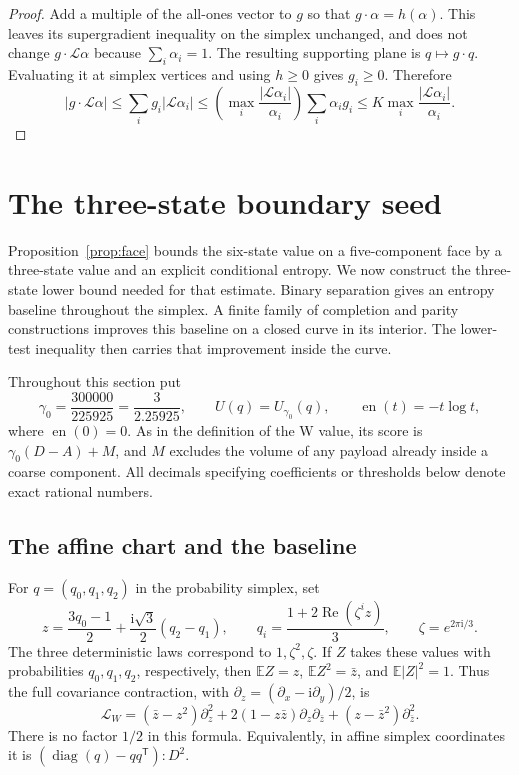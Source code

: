 \documentclass[11pt]{article}
\numberwithin{equation}{section}
\theoremstyle{definition}
\theoremstyle{remark}
\newcommand{\E}{\mathbb E}
\DeclareMathOperator{\diag}{diag}
\DeclareMathOperator{\en}{en}
\begin{document}
\begin{proof}
Add a multiple of the all-ones vector to \(g\) so that
\(g\cdot\alpha=h(\alpha)\).  This leaves its supergradient inequality
on the simplex unchanged, and does not change \(g\cdot\mathcal L\alpha\)
because \(\sum_i\alpha_i=1\).  The resulting supporting plane is
\(q\mapsto g\cdot q\).  Evaluating it at simplex vertices and using
\(h\geq0\) gives \(g_i\geq0\).  Therefore
\[
 |g\cdot\mathcal L\alpha|
 \leq\sum_i g_i|\mathcal L\alpha_i|
 \leq\left(\max_i\frac{|\mathcal L\alpha_i|}{\alpha_i}\right)
       \sum_i\alpha_i g_i
 \leq K\max_i\frac{|\mathcal L\alpha_i|}{\alpha_i}.
\]
\end{proof}

\section{The three-state boundary seed}
\label{cert:w-seed-section}

Proposition~\ref{prop:face} bounds the six-state value on a five-component
face by a three-state value and an explicit conditional entropy.  We now
construct the three-state lower bound needed for that estimate.
Binary separation gives an entropy baseline throughout the simplex.
A finite family of completion and parity constructions improves this baseline
on a closed curve in its interior.  The lower-test inequality then carries
that improvement inside the curve.

Throughout this section put
\[
 \gamma _0=\frac{300000}{225925}=\frac3{2.25925},\qquad
 U(q)=U_{\gamma _0}(q),\qquad \en(t)=-t\log t,
\]
where $\en(0)=0$.  As in the definition of the W value, its score is
$\gamma _0(D-A)+M$, and $M$ excludes the volume of any payload already
inside a coarse component.  All decimals specifying coefficients or
thresholds below denote exact rational numbers.

\subsection{The affine chart and the baseline}

For $q=(q_0,q_1,q_2)$ in the probability simplex, set
\begin{equation}
 z=\frac{3q_0-1}{2}+\frac{\mathrm i\sqrt3}{2}(q_2-q_1),
 \qquad
 q_i=\frac{1+2\operatorname{Re}(\zeta^i z)}3,
 \qquad \zeta=e^{2\pi\mathrm i/3}.
 \label{cert:w-coordinate}
\end{equation}
The three deterministic laws correspond to $1,\zeta^2,\zeta$.
If $Z$ takes these values with probabilities $q_0,q_1,q_2$, respectively,
then $\E Z=z$, $\E Z^2=\bar z$, and $\E|Z|^2=1$.  Thus the full
covariance contraction, with $\partial_z=(\partial_x-\mathrm i\partial_y)/2$,
is
\begin{equation}
 \mathcal L_W
 = (\bar z-z^2)\partial_z^2
   +2(1-z\bar z)\partial_z\partial_{\bar z}
   +(z-\bar z^2)\partial_{\bar z}^2.
 \label{cert:w-operator}
\end{equation}
There is no factor $1/2$ in this formula.  Equivalently, in affine simplex
coordinates it is $(\diag(q)-qq^{\mathsf T}):D^2$.
\end{document}
